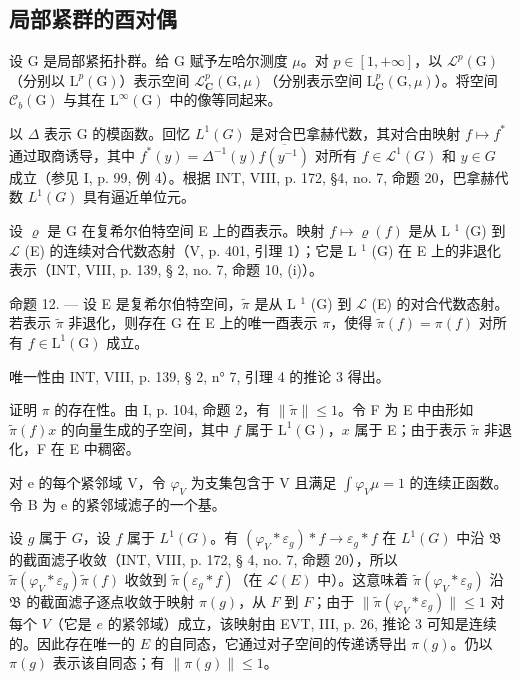 \subsection{局部紧群的酉对偶}

设 G 是局部紧拓扑群。给 G 赋予左哈尔测度 \(\mu\)。对 \(p \in [1, +\infty]\)，以 \(\mathcal{L}^{p}(\mathrm{G})\)（分别以 \(\mathrm{L}^{p}(\mathrm{G})\)）表示空间 \(\mathcal{L}_{\mathbf{C}}^{p}(\mathrm{G}, \mu)\)（分别表示空间 \(\mathrm{L}_{\mathbf{C}}^{p}(\mathrm{G}, \mu)\)）。将空间 \(\mathcal{C}_{b}(\mathrm{G})\) 与其在 \(\mathrm{L}^{\infty}(\mathrm{G})\) 中的像等同起来。

以 \(\Delta\) 表示 G 的模函数。回忆 \(L^1(G)\) 是对合巴拿赫代数，其对合由映射 \(f \mapsto f^*\) 通过取商诱导，其中 \(f^*(y) = \Delta^{-1}(y)\overline{f(y^{-1})}\) 对所有 \(f \in \mathcal{L}^1(G)\) 和 \(y \in G\) 成立（参见 I, p. 99, 例 4）。根据 INT, VIII, p. 172, §4, no. 7, 命题 20，巴拿赫代数 \(L^1(G)\) 具有逼近单位元。

设 \(\varrho\) 是 G 在复希尔伯特空间 E 上的酉表示。映射 \(f\mapsto\varrho(f)\) 是从 L \(^{1}\) (G) 到 \(\mathcal{L}\) (E) 的连续对合代数态射（V, p. 401, 引理 1）；它是 L \(^{1}\) (G) 在 E 上的非退化表示（INT, VIII, p. 139, § 2, no. 7, 命题 10, (i)）。

命题 12. --- 设 E 是复希尔伯特空间，\(\widetilde{\pi}\) 是从 L \(^{1}\) (G) 到 \(\mathcal{L}\) (E) 的对合代数态射。若表示 \(\widetilde{\pi}\) 非退化，则存在 G 在 E 上的唯一酉表示 \(\pi\)，使得 \(\widetilde{\pi}(f)=\pi(f)\) 对所有 \(f\in\mathrm{L}^{1}(\mathrm{G})\) 成立。

唯一性由 INT, VIII, p. 139, § 2, n° 7, 引理 4 的推论 3 得出。

证明 \(\pi\) 的存在性。由 I, p. 104, 命题 2，有 \(\| \widetilde{\pi}\| \leqslant 1\)。令 F 为 E 中由形如 \(\widetilde{\pi}(f)x\) 的向量生成的子空间，其中 \(f\) 属于 \(\mathrm{L}^1 (\mathrm{G})\)，\(x\) 属于 E；由于表示 \(\widetilde{\pi}\) 非退化，F 在 E 中稠密。

对 e 的每个紧邻域 V，令 \(\varphi_{V}\) 为支集包含于 V 且满足 \(\int\varphi_{V}\mu=1\) 的连续正函数。令 B 为 e 的紧邻域滤子的一个基。

设 \(g\) 属于 \(G\)，设 \(f\) 属于 \(L^1(G)\)。有 \((\varphi_V * \varepsilon_g) * f \to \varepsilon_g * f\) 在 \(L^1(G)\) 中沿 \(\mathfrak{B}\) 的截面滤子收敛（INT, VIII, p. 172, § 4, no. 7, 命题 20），所以 \(\widetilde{\pi}(\varphi_V * \varepsilon_g)\widetilde{\pi}(f)\) 收敛到 \(\widetilde{\pi}(\varepsilon_g * f)\)（在 \(\mathcal{L}(E)\) 中）。这意味着 \(\widetilde{\pi}(\varphi_V * \varepsilon_g)\) 沿 \(\mathfrak{B}\) 的截面滤子逐点收敛于映射 \(\pi(g)\)，从 \(F\) 到 \(F\)；由于 \(\| \widetilde{\pi}(\varphi_V * \varepsilon_g) \| \leqslant 1\) 对每个 \(V\)（它是 \(e\) 的紧邻域）成立，该映射由 EVT, III, p. 26, 推论 3 可知是连续的。因此存在唯一的 \(E\) 的自同态，它通过对子空间的传递诱导出 \(\pi(g)\)。仍以 \(\pi(g)\) 表示该自同态；有 \(\| \pi(g) \| \leqslant 1\)。

